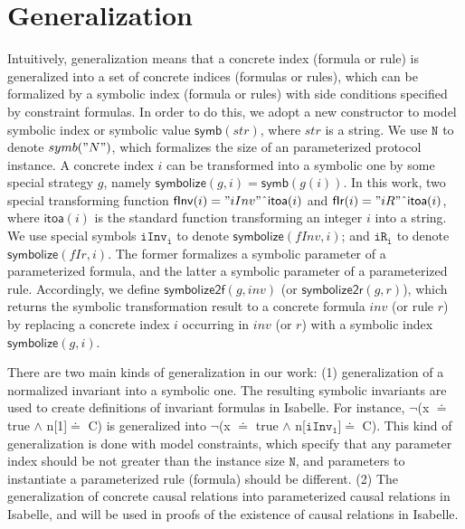 \documentclass[final]{IEEEtran}
\def \andc {\wedge }
\def \negc {\lnot}
\def \cat {\symbol{94}}
\def \iInv {iInv}
\def \iR {iR}
\newcommand\cai[1]{\textcolor{blue}{ #1} }
\begin{document}
\section{Generalization}\label{sec:generalization}
Intuitively, generalization means that a concrete index (formula or rule) is generalized into a set of concrete indices (formulas or rules), which can be formalized  by a symbolic index (formula or rules) with side conditions  specified by   constraint formulas.     In order to do this, we  adopt a new constructor  to model symbolic index or symbolic value $\mathsf{symb}(str)$, where $str$ is   a string.  We use $\mathtt{N}$ to denote $symb("N")$, which formalizes the size of an parameterized protocol instance. A concrete index $i$ can be transformed into a symbolic one by some special strategy $g$, namely  $\mathsf{symbolize}(g,i)=\mathsf{symb}(g(i))$. In this work, two special transforming function $\mathsf{fInv}(i)="iInv"\cat \mathsf{itoa}(i)$ and $\mathsf{fIr}(i)="iR"\cat \mathsf{itoa}(i)$, where $\mathsf{itoa}(i)$ is the standard function transforming an integer $i$ into a string. We use  special symbols $\mathtt{\iInv_i}$  to denote $\mathsf{symbolize}(fInv,i)$;  and $\mathtt{\iR_i}$ to denote $\mathsf{symbolize}(fIr,i)$. The former formalizes a symbolic parameter of a parameterized   formula, and the latter    a symbolic  parameter of a parameterized rule. Accordingly, we define $\mathsf{symbolize2f}(g,inv)$ (or  $\mathsf{symbolize2r}(g,r)$), which returns the symbolic transformation result to a concrete formula $inv$ (or rule $r$) by replacing a concrete index $i$ occurring in $inv$ (or $r$) with a symbolic index $\mathsf{symbolize}(g,i)$.


There are two
main kinds of generalization in our work: (1) generalization of a normalized invariant into a symbolic one. %
The resulting symbolic invariants are used to create definitions of invariant formulas in Isabelle. For instance,  $\negc$(x $\doteq$ true $\andc$ n[1]$\doteq$ C) is generalized into $\negc$(x $\doteq$ true $\andc$ n[$\mathtt{\iInv_1}$]$\doteq$ C).  This kind of generalization is done with model constraints, which  specify  that any parameter index should be not greater than the instance size $\mathtt{N}$, and parameters to instantiate a parameterized rule (formula) should be different. (2) The generalization of concrete causal relations into parameterized causal relations in Isabelle, and will be used in proofs of the existence  of causal relations in Isabelle.
\end{document}
